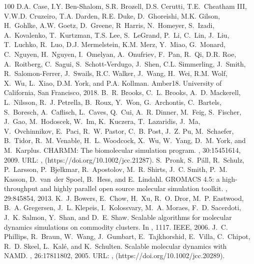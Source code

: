 \documentclass[a4paper,11pt,oneside,english]{sphinxmanual}
\begin{document}
\begin{sphinxthebibliography}{100}
D.A. Case, I.Y. Ben-Shalom, S.R. Brozell, D.S. Cerutti, T.E. Cheatham III, V.W.D. Cruzeiro, T.A. Darden, R.E. Duke, D. Ghoreishi, M.K. Gilson, H. Gohlke, A.W. Goetz, D. Greene, R Harris, N. Homeyer, S. Izadi, A. Kovalenko, T. Kurtzman, T.S. Lee, S. LeGrand, P. Li, C. Lin, J. Liu, T. Luchko, R. Luo, D.J. Mermelstein, K.M. Merz, Y. Miao, G. Monard, C. Nguyen, H. Nguyen, I. Omelyan, A. Onufriev, F. Pan, R. Qi, D.R. Roe, A. Roitberg, C. Sagui, S. Schott-Verdugo, J. Shen, C.L. Simmerling, J. Smith, R. Salomon-Ferrer, J. Swails, R.C. Walker, J. Wang, H. Wei, R.M. Wolf, X. Wu, L. Xiao, D.M. York, and P.A. Kollman. Amber18. University of California, San Francisco, 2018.
B. R. Brooks, C. L. Brooks, A. D. Mackerell, L. Nilsson, R. J. Petrella, B. Roux, Y. Won, G. Archontis, C. Bartels, S. Boresch, A. Caflisch, L. Caves, Q. Cui, A. R. Dinner, M. Feig, S. Fischer, J. Gao, M. Hodoscek, W. Im, K. Kuczera, T. Lazaridis, J. Ma, V. Ovchinnikov, E. Paci, R. W. Pastor, C. B. Post, J. Z. Pu, M. Schaefer, B. Tidor, R. M. Venable, H. L. Woodcock, X. Wu, W. Yang, D. M. York, and M. Karplus. CHARMM: The biomolecular simulation program. , 30:1545\textendash{}1614, 2009. URL: ,  (https://doi.org/10.1002/jcc.21287).
S. Pronk, S. Páll, R. Schulz, P. Larsson, P. Bjelkmar, R. Apostolov, M. R. Shirts, J. C. Smith, P. M. Kasson, D. van der Spoel, B. Hess, and E. Lindahl. GROMACS 4.5: a high-throughput and highly parallel open source molecular simulation toolkit. , 29:845\textendash{}854, 2013.
K. J. Bowers, E. Chow, H. Xu, R. O. Dror, M. P. Eastwood, B. A. Gregersen, J. L. Klepeis, I. Kolossvary, M. A. Moraes, F. D. Sacerdoti, J. K. Salmon, Y. Shan, and D. E. Shaw. Scalable algorithms for molecular dynamics simulations on commodity clusters. In , 11\textendash{}17. IEEE, 2006.
J. C. Phillips, R. Braun, W. Wang, J. Gumbart, E. Tajkhorshid, E. Villa, C. Chipot, R. D. Skeel, L. Kalé, and K. Schulten. Scalable molecular dynamics with NAMD. , 26:1781\textendash{}1802, 2005. URL: ,  (https://doi.org/10.1002/jcc.20289).

\end{sphinxthebibliography}
\end{document}
